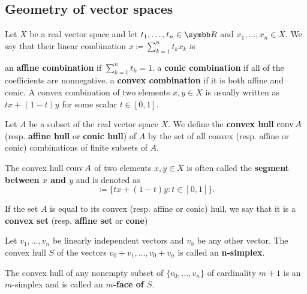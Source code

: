 \subsection{Geometry of vector spaces}\label{subsec:geometry_of_vector_spaces}

\begin{definition}\label{def:real_linear_combinations}
  Let \( X \) be a real vector space and let \( t_1, \ldots, t_n \in \BB{R} \) and \( x_1, \ldots, x_n \in X \). We say that their linear combination \( x \coloneqq \sum_{k=1}^n t_k x_k \) is

  \begin{defenum}
     an \textbf{affine combination} if \( \sum_{k=1}^n t_k = 1 \).
     a \textbf{conic combination} if all of the coefficients are nonnegative.
     a \textbf{convex combination} if it is both affine and conic. A convex combination of two elements \( x, y \in X \) is usually written as \( tx + (1-t)y \) for some scalar \( t \in [0, 1] \).
  \end{defenum}
\end{definition}

\begin{definition}\label{def:linear_combination_hulls}
  Let \( A \) be a subset of the real vector space \( X \). We define the \textbf{convex hull} \( \operatorname{conv} A \) (resp. \textbf{affine hull} or \textbf{conic hull}) of \( A \) by the set of all convex (resp. affine or conic) combinations of finite subsets of \( A \).

  The convex hull \( \operatorname{conv} A \) of two elements \( x, y \in X \) is often called the \textbf{segment between \( x \) and \( y \)} and is denoted as
  \begin{equation*}
    [x, y] \coloneqq \{ tx + (1-t)y \colon t \in [0, 1] \}.
  \end{equation*}

  If the set \( A \) is equal to its convex (resp. affine or conic) hull, we say that it is a \textbf{convex set} (resp. \textbf{affine set} or \textbf{cone})
\end{definition}

\begin{definition}\label{def:simplex}
  Let \( v_1, \ldots, v_n \) be linearly independent vectors and \( v_0 \) be any other vector. The convex hull \( S \) of the vectors \( v_0 + v_1, \ldots, v_0 + v_n \) is called an \textbf{n-simplex}.

  The convex hull of any nonempty subset of \( \{ v_0, \ldots, v_n \} \) of cardinality \( m + 1 \) is an \( m \)-simplex and is called an \textbf{\( m \)-face of \( S \)}.
\end{definition}
